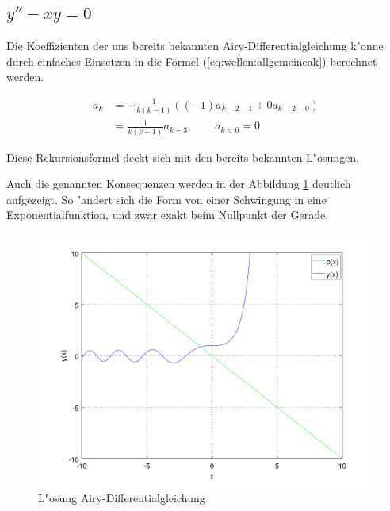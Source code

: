 \subsection{\texorpdfstring{$y''-xy = 0$}{y''-xy = 0}}
Die Koeffizienten der uns bereits bekannten Airy-Differentialgleichung k"onne 
durch einfaches Einsetzen in die Formel (\ref{eq:wellen:allgemeineak}) 
berechnet werden.

\begin{equation*}
	\begin{split}
		a_k &= -\frac{1}{k(k-1)} ((-1) a_{k-2-1} + 
		0 a_{k-2-0})
		\\
		&= \frac{1}{k(k-1)} a_{k-3}, \qquad a_{k < 0} = 0
	\end{split}
\end{equation*}

Diese Rekursionsformel deckt sich mit den bereits bekannten L"osungen.

Auch die genannten Konsequenzen werden in der Abbildung 
\ref{fig:wellen:airy-dgl} deutlich aufgezeigt. So "andert sich die Form von 
einer Schwingung in eine Exponentialfunktion, und zwar exakt beim Nullpunkt der 
Gerade.

\begin{figure}
	\includegraphics[scale=0.65]{./wellen/images/allgemein/n1.pdf}
	\caption{L"osung Airy-Differentialgleichung}
	\label{fig:wellen:airy-dgl}
\end{figure}